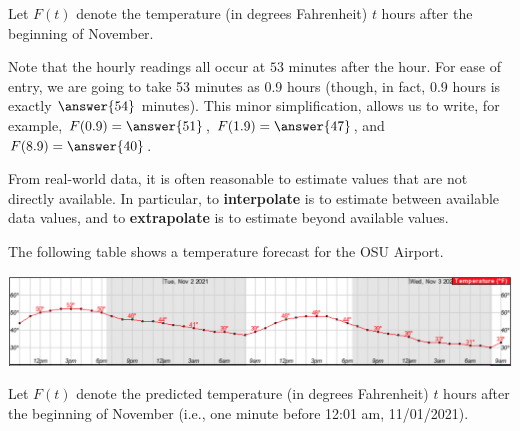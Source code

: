 \documentclass[nooutcomes]{ximera}
\begin{document}
\begin{problem}
Let $F(t)$ denote the temperature (in degrees Fahrenheit) $t$ hours after the beginning of November.  

Note that the hourly readings all occur at $53$ minutes after the hour.  For ease of entry, we are going to take 53 minutes as 0.9 hours (though, in fact, 0.9 hours is exactly $\answer{54}$ minutes).  This minor simplification, allows us to write, for example, $F(0.9) = \answer{51}$, $F(1.9)=\answer{47}$, and $F(8.9)=\answer{40}$.  

From real-world data, it is often reasonable to estimate values that are not directly available.  In particular, to \textbf{interpolate} is to estimate between available data values, and to \textbf{extrapolate} is to estimate beyond available values.  
\end{problem}


\begin{problem}
The following table shows a temperature forecast for the OSU Airport.  
\begin{image}
\includegraphics[scale=0.5]{columbusTemp.png}
\end{image}
Let $F(t)$ denote the predicted temperature (in degrees Fahrenheit) $t$ hours after the beginning of November (i.e., one minute before 12:01 am, 11/01/2021).  
\end{problem}
\end{document}
